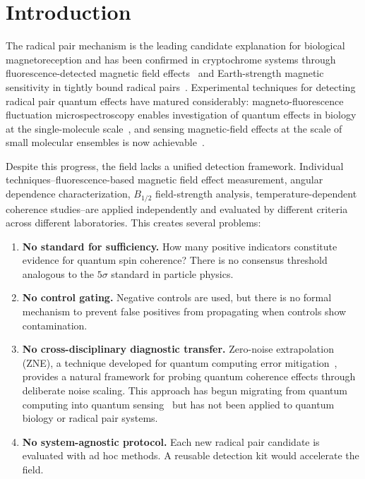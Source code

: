 \documentclass[preprint,amsmath,amssymb]{revtex4-2}
\begin{document}
\section{Introduction}

The radical pair mechanism is the leading candidate explanation for biological magnetoreception and has been confirmed in cryptochrome systems through fluorescence-detected magnetic field effects~\cite{maeda2012} and Earth-strength magnetic sensitivity in tightly bound radical pairs~\cite{xu2021}. Experimental techniques for detecting radical pair quantum effects have matured considerably: magneto-fluorescence fluctuation microspectroscopy enables investigation of quantum effects in biology at the single-molecule scale~\cite{antill2025}, and sensing magnetic-field effects at the scale of small molecular ensembles is now achievable~\cite{kerpal2019}.

Despite this progress, the field lacks a unified detection framework. Individual techniques--fluorescence-based magnetic field effect measurement, angular dependence characterization, $B_{1/2}$ field-strength analysis, temperature-dependent coherence studies--are applied independently and evaluated by different criteria across different laboratories. This creates several problems:

\begin{enumerate}
\item \textbf{No standard for sufficiency.} How many positive indicators constitute evidence for quantum spin coherence? There is no consensus threshold analogous to the $5\sigma$ standard in particle physics.

\item \textbf{No control gating.} Negative controls are used, but there is no formal mechanism to prevent false positives from propagating when controls show contamination.

\item \textbf{No cross-disciplinary diagnostic transfer.} Zero-noise extrapolation (ZNE), a technique developed for quantum computing error mitigation~\cite{temme2017,giurgica2020}, provides a natural framework for probing quantum coherence effects through deliberate noise scaling. This approach has begun migrating from quantum computing into quantum sensing~\cite{vandyke2024} but has not been applied to quantum biology or radical pair systems.

\item \textbf{No system-agnostic protocol.} Each new radical pair candidate is evaluated with ad hoc methods. A reusable detection kit would accelerate the field.
\end{enumerate}
\end{document}
